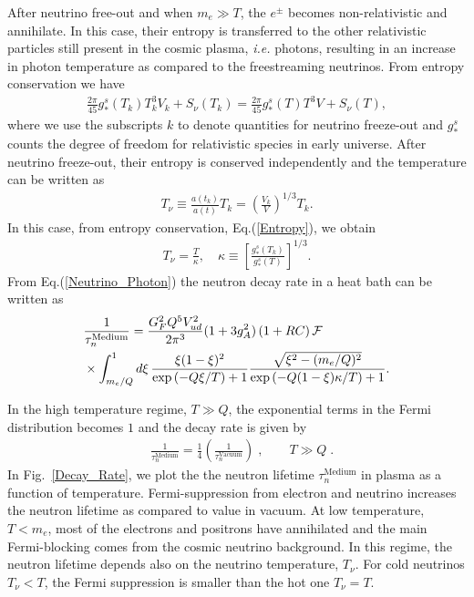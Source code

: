 After neutrino free-out and when $m_e\gg T$, the $e^{\pm}$ becomes non-relativistic and annihilate. In this case, their entropy is transferred to the other relativistic particles still present in the cosmic plasma, {\it i.e.\/} photons, resulting in an increase in photon temperature as compared to the freestreaming neutrinos. From entropy conservation we have
\begin{align}
\label{Entropy}
\frac{2\pi}{45}g^s_\ast(T_k)T^3_kV_k+S_{\nu}(T_k)=\frac{2\pi}{45}g^s_\ast(T)T^3V+S_{\nu}(T),
\end{align}
where we use the subscripts $k$ to denote quantities for neutrino freeze-out and $g^s_\ast$ counts the degree of freedom for relativistic species in early universe. After neutrino freeze-out, their entropy is conserved independently and the temperature can be written as
\begin{align}
T_\nu\equiv\frac{a(t_k)}{a(t)}T_k=\left(\frac{V_k}{V}\right)^{1/3}T_k.
\end{align}
In this case, from entropy conservation, Eq.(\ref{Entropy}), we obtain
\begin{align}
\label{Neutrino_Photon}
T_\nu=\frac{T}{\kappa},\,\,\,\,\,\,\kappa\equiv\left[\frac{g^s_\ast(T_k)}{g^s_\ast(T)}\right]^{1/3}.
\end{align}
From Eq.(\ref{Neutrino_Photon}) the neutron decay rate in a heat bath can be written as
\begin{align}
\label{Decay_rate_03}
&\frac{1}{\tau_n^\mathrm{Medium}}= \frac{G^2_FQ^5V^2_{ud}}{2\pi^3}(1+3g^2_A)\,(1+RC)\,\mathcal{F}\\
&\times\int^1_{m_e/Q}d\xi\,\frac{\xi(1-\xi)^2}{\exp\left(-Q\xi/{T}\right)+1}\frac{\sqrt{\xi^2-(m_e/Q)^2}}{\exp\left(-Q(1-\xi)\kappa/T\right)+1}.\notag
\end{align}

In the high temperature regime, $T\gg Q$, the exponential terms in the Fermi distribution becomes $1$ and the decay rate is given by
\begin{align}
&\frac{1}{\tau_n^\mathrm{Medium}}=\frac{1}{4}\left(\frac{1}{\tau_n^\mathrm{Vacuum}}\right)\;,
\qquad
T\gg Q\;.
\end{align}
In Fig.~\ref{Decay_Rate}, we plot the the neutron lifetime $\tau^\mathrm{Medium}_n$ in plasma as a function of temperature. Fermi-suppression from electron and neutrino increases the neutron lifetime as compared to value in vacuum. At low temperature, $T<m_e$, most of the electrons and positrons have annihilated and the main Fermi-blocking comes from the cosmic neutrino background. In this regime, the neutron lifetime depends also on the neutrino temperature, $T_\nu$. For cold neutrinos $T_\nu<T$, the Fermi suppression is smaller than the hot one $T_\nu=T$. 


